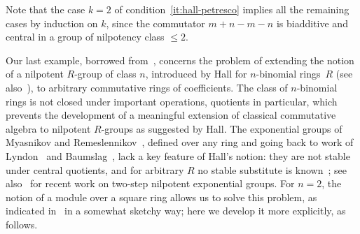 \documentclass[reqno,a4paper]{amsart}
\theoremstyle{plain}
\theoremstyle{definition}
\begin{document}
Note that the case \(k=2\) of condition~\ref{it:hall-petresco} implies all the remaining cases by induction on \(k\), since the commutator \(m+n-m-n\) is biadditive and central in a group of nilpotency class \(\leq 2\).

Our last example, borrowed from~\cite{P2RM}, concerns the problem of extending the notion of a nilpotent \(R\)-group of class \(n\), introduced by Hall for \(n\)-binomial rings~\(R\) \cite{Hall:Edmonton} (see also~\cite{Warfield:Nilpotent}), to arbitrary commutative rings of coefficients. The class of \(n\)-binomial rings is not closed under important operations, quotients in particular, which prevents the development of a meaningful extension of classical commutative algebra to nilpotent \(R\)-groups as suggested by Hall. The exponential groups of Myasnikov and Remeslennikov~\cite{MR94}, defined over any ring and going back to work of Lyndon~\cite{Lyndon1960} and Baumslag~\cite{Baumslag:UniqueRoots}, lack a key feature of Hall's notion: they are not stable under central quotients, and for arbitrary \(R\) no stable substitute is known~\cite[Theorem~11.14 and Problem~1]{IKK}; see also~\cite{Amaglobeli-Miasnikov} for recent work on two-step nilpotent exponential groups. For \(n=2\), the notion of a module over a square ring allows us to solve this problem, as indicated in~\cite{P2RM} in a somewhat sketchy way; here we develop it more explicitly, as follows.
\end{document}
